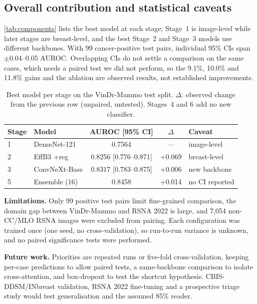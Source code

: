\documentclass[conference]{IEEEtran}
\newcommand{\vindr}{VinDr-Mammo}
\newcommand{\rsna}{RSNA 2022}
\begin{document}
\subsection{Overall contribution and statistical caveats}

\autoref{tab:components} lists the best model at each stage; Stage~1 is image-level while later stages are breast-level, and the best Stage~2 and Stage~3 models use different backbones. With 99 cancer-positive test pairs, individual 95\% CIs span $\pm$0.04--0.05 AUROC. Overlapping CIs do not settle a comparison on the same cases, which needs a paired test we did not perform, so the 9.1\%, 10.0\% and 11.8\% gains and the ablation are observed results, not established improvements.

\begin{table}[!t]
\centering
\caption{Best model per stage on the \vindr{} test split. $\Delta$: observed change from the previous row (unpaired, untested). Stages~4 and 6 add no new classifier.}
\label{tab:components}
{\scriptsize\setlength{\tabcolsep}{2pt}%
\begin{tabular}{|l|l|c|c|l|}
\hline
\textbf{Stage} & \textbf{Model} & \textbf{AUROC [95\% CI]} & \textbf{$\Delta$} & \textbf{Caveat} \\
\hline
1 & DenseNet-121 & 0.7564 & --- & image-level \\
\hline
2 & EffB3 +reg & 0.8256 [0.776--0.871] & +0.069 & breast-level \\
\hline
3 & ConvNeXt-Base & 0.8317 [0.783--0.875] & +0.006 & new backbone \\
\hline
5 & Ensemble (16) & 0.8458 & +0.014 & no CI reported \\
\hline
\end{tabular}}
\end{table}

\textbf{Limitations.} Only 99 positive test pairs limit fine-grained comparison, the domain gap between \vindr{} and \rsna{} is large, and 7,054 non-CC/MLO RSNA images were excluded from pairing. Each configuration was trained once (one seed, no cross-validation), so run-to-run variance is unknown, and no paired significance tests were performed.

\textbf{Future work.} Priorities are repeated runs or five-fold cross-validation, keeping per-case predictions to allow paired tests, a same-backbone comparison to isolate cross-attention, and box-dropout to test the shortcut hypothesis. CBIS-DDSM/INbreast validation, \rsna{} fine-tuning and a prospective triage study would test generalisation and the assumed 85\% reader.
\end{document}
